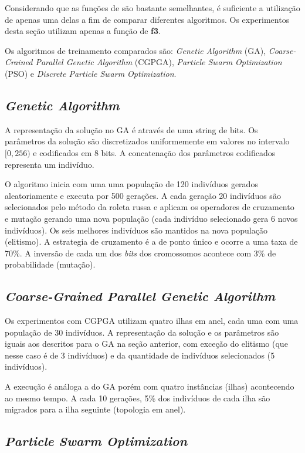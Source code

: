 Considerando que as funções de \fitness são bastante semelhantes, é suficiente a utilização de apenas uma delas a fim de comparar diferentes algoritmos. Os experimentos desta seção utilizam apenas a função de \fitness \textbf{f3}.

Os algoritmos de treinamento comparados são: \textit{Genetic Algorithm} (GA), \textit{Coarse-Crained Parallel Genetic Algorithm} (CGPGA), \textit{Particle Swarm Optimization} (PSO) e \textit{Discrete Particle Swarm Optimization}.

\subsection{\textit{Genetic Algorithm}}

A representação da solução no GA é através de uma string de bits. Os parâmetros da solução são discretizados uniformemente em valores no intervalo $[0, 256)$ e codificados em 8 bits. A concatenação dos parâmetros codificados representa um indivíduo.

O algoritmo inicia com uma uma população de 120 indivíduos gerados aleatoriamente e executa por 500 gerações. A cada geração 20 indivíduos são selecionados pelo método da roleta russa e aplicam os operadores de cruzamento e mutação gerando uma nova população (cada indivíduo selecionado gera 6 novos indivíduos). Os seis melhores indivíduos são mantidos na nova população (elitismo). A estrategia de cruzamento é a de ponto único e ocorre a uma taxa de 70\%. A inversão de cada um dos \textit{bits} dos cromossomos acontece com 3\% de probabilidade (mutação).

\subsection{\textit{Coarse-Grained Parallel Genetic Algorithm}}

Os experimentos com CGPGA utilizam quatro ilhas em anel, cada uma com uma população de 30 indivíduos. A representação da solução e os parâmetros são iguais aos descritos para o GA na seção anterior, com exceção do elitismo (que nesse caso é de 3 indivíduos) e da quantidade de indivíduos selecionados (5 indivíduos).

A execução é análoga a do GA porém com quatro instâncias (ilhas) acontecendo ao mesmo tempo. A cada 10 gerações, 5\% dos indivíduos de cada ilha são migrados para a ilha seguinte (topologia em anel).

\subsection{\textit{Particle Swarm Optimization}}

